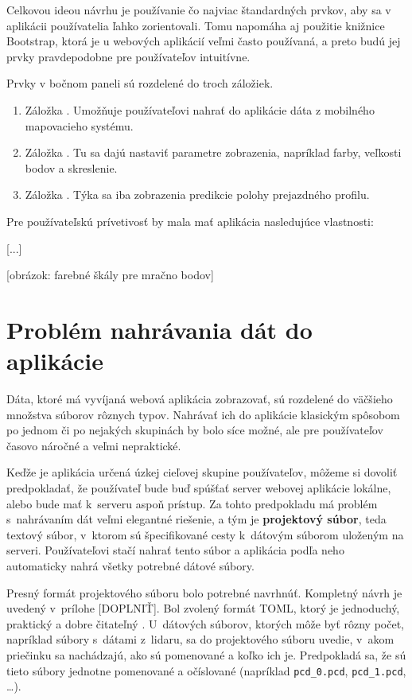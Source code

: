 Celkovou ideou návrhu je používanie čo najviac štandardných prvkov, aby sa v aplikácii používatelia ľahko zorientovali. Tomu napomáha aj použitie knižnice Bootstrap, ktorá je u webových aplikácií veľmi často používaná, a preto budú jej prvky pravdepodobne pre používateľov intuitívne.

Prvky v bočnom paneli sú rozdelené do troch záložiek.

\begin{enumerate}
    \item Záložka . Umožňuje používateľovi nahrať do aplikácie dáta z mobilného mapovacieho systému.
    \item Záložka . Tu sa dajú nastaviť parametre zobrazenia, napríklad farby, veľkosti bodov a skreslenie.
    \item Záložka . Týka sa iba zobrazenia predikcie polohy prejazdného profilu.
\end{enumerate}

Pre používateľskú prívetivosť by mala mať aplikácia nasledujúce vlastnosti:

[...]

[obrázok: farebné škály pre mračno bodov]

\section{Problém nahrávania dát do aplikácie}

Dáta, ktoré má vyvíjaná webová aplikácia zobrazovať, sú rozdelené do väčšieho množstva súborov rôznych typov. Nahrávať ich do aplikácie klasickým spôsobom po jednom či po nejakých skupinách by bolo síce možné, ale pre používateľov časovo náročné a veľmi nepraktické.

Keďže je aplikácia určená úzkej cieľovej skupine používateľov, môžeme si dovoliť predpokladať, že používateľ bude buď spúšťať server webovej aplikácie lokálne, alebo bude mať k~serveru aspoň prístup. Za tohto predpokladu má problém s~nahrávaním dát veľmi elegantné riešenie, a tým je \textbf{projektový súbor}, teda textový súbor, v~ktorom sú špecifikované cesty k~dátovým súborom uloženým na serveri. Používateľovi stačí nahrať tento súbor a aplikácia podľa neho automaticky nahrá všetky potrebné dátové súbory.

Presný formát projektového súboru bolo potrebné navrhnúť. Kompletný návrh je uvedený v~prílohe [DOPLNIŤ]. Bol zvolený formát TOML, ktorý je jednoduchý, praktický a dobre čitateľný \cite{toml}. U~dátových súborov, ktorých môže byť rôzny počet, napríklad súbory s~dátami z~lidaru, sa do projektového súboru uvedie, v~akom priečinku sa nachádzajú, ako sú pomenované a koľko ich je. Predpokladá sa, že sú tieto súbory jednotne pomenované a očíslované (napríklad \texttt{pcd\_0.pcd}, \texttt{pcd\_1.pcd}, \dots).

